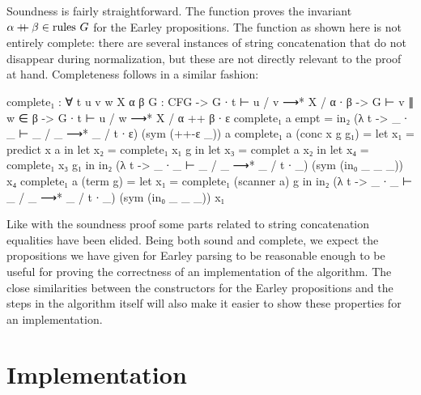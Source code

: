 		Soundness is fairly straightforward. The  function proves
		the invariant $\alpha \mathbin{{+}\mspace{-8mu}{+}} \beta \in \textrm{rules } G$ for the
		Earley propositions. The function as shown here is not entirely
		complete: there are several instances of string concatenation that do
		not disappear during normalization, but these are not directly relevant
		to the proof at hand. Completeness follows in a similar fashion:

		\begin{code}
			complete₁ : ∀ {t u v w X α β} {G : CFG} ->
			  G ∙ t ⊢ u / v ⟶* X / α ∙ β ->
			  G ⊢ v ∥ w ∈ β ->
			    G ∙ t ⊢ u / w ⟶* X / α ++ β ∙ ε
			complete₁ a empt = in₂ (λ t -> _ ∙ _ ⊢ _ / _ ⟶* _ / t ∙ ε) (sym (++-ε _)) a
			complete₁ a (conc x g g₁) =
			  let x₁ = predict x a in
			  let x₂ = complete₁ x₁ g in
			  let x₃ = complet a x₂ in
			  let x₄ = complete₁ x₃ g₁ in
			  in₂ (λ t -> _ ∙ _ ⊢ _ / _ ⟶* _ / t ∙ _) (sym (in₀ _ _ _)) x₄
			complete₁ a (term g) =
			  let x₁ = complete₁ (scanner a) g in
			  in₂ (λ t -> _ ∙ _ ⊢ _ / _ ⟶* _ / t ∙ _) (sym (in₀ _ _ _)) x₁
		\end{code}

		Like with the soundness proof some parts related to string
		concatenation equalities have been elided. Being both sound and
		complete, we expect the propositions we have given for Earley parsing
		to be reasonable enough to be useful for proving the correctness of an
		implementation of the algorithm. The close similarities between the
		constructors for the Earley propositions and the steps in the algorithm
		itself will also make it easier to show these properties for an
		implementation.

	\section{Implementation}

